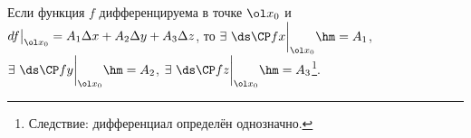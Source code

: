 
	 Если функция $f$ дифференцируема в точке $\ol x_0$ и $d f\big|_{\ol x_0} = A_1\Delta x + A_2 \Delta y + A_3\Delta z$, то
	 $\exists\ \ds\CP fx\bigg|_{\ol x_0} \hm= A_1$, $\exists\ \ds\CP fy\bigg|_{\ol x_0} \hm= A_2$, $\exists\ \ds\CP fz\bigg|_{\ol x_0} \hm= A_3$\footnote{Следствие: дифференциал определён однозначно.}.
	 